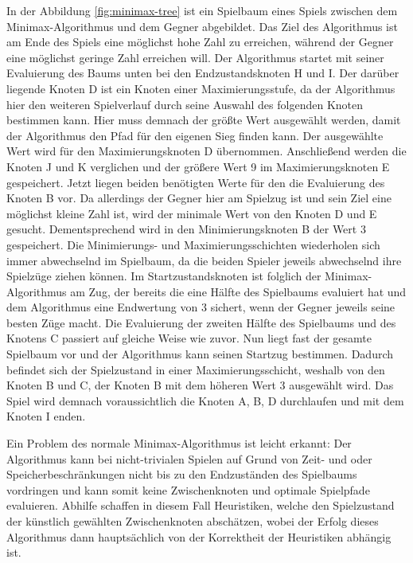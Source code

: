In der Abbildung \ref{fig:minimax-tree} ist ein Spielbaum eines Spiels zwischen dem Minimax-Algorithmus und dem Gegner abgebildet. Das Ziel des Algorithmus ist am Ende des Spiels eine möglichst hohe Zahl zu erreichen, während der Gegner eine möglichst geringe Zahl erreichen will. Der Algorithmus startet mit seiner Evaluierung des Baums unten bei den Endzustandsknoten H und I. Der darüber liegende Knoten D ist ein Knoten einer Maximierungsstufe, da der Algorithmus hier den weiteren Spielverlauf durch seine Auswahl des folgenden Knoten bestimmen kann. Hier muss demnach der größte Wert ausgewählt werden, damit der Algorithmus den Pfad für den eigenen Sieg finden kann. Der ausgewählte Wert wird für den Maximierungsknoten D übernommen. Anschließend werden die Knoten J und K verglichen und der größere Wert 9 im Maximierungsknoten E gespeichert. Jetzt liegen beiden benötigten Werte für den die Evaluierung des Knoten B vor. Da allerdings der Gegner hier am Spielzug ist und sein Ziel eine möglichst kleine Zahl ist, wird der minimale Wert von den Knoten D und E gesucht. Dementsprechend wird in den Minimierungsknoten B der Wert 3 gespeichert. Die Minimierungs- und Maximierungsschichten wiederholen sich immer abwechselnd im Spielbaum, da die beiden Spieler jeweils abwechselnd ihre Spielzüge ziehen können. Im Startzustandsknoten ist folglich der Minimax-Algorithmus am Zug, der bereits die eine Hälfte des Spielbaums evaluiert hat und dem Algorithmus eine Endwertung von 3 sichert, wenn der Gegner jeweils seine besten Züge macht. Die Evaluierung der zweiten Hälfte des Spielbaums und des Knotens C passiert auf gleiche Weise wie zuvor. Nun liegt fast der gesamte Spielbaum vor und der Algorithmus kann seinen Startzug bestimmen. Dadurch befindet sich der Spielzustand in einer Maximierungsschicht, weshalb von den Knoten B und C, der Knoten B mit dem höheren Wert 3 ausgewählt wird. Das Spiel wird demnach voraussichtlich die Knoten A, B, D durchlaufen und mit dem Knoten I enden.

Ein Problem des normale Minimax-Algorithmus ist leicht erkannt: Der Algorithmus kann bei nicht-trivialen Spielen auf Grund von Zeit- und oder Speicherbeschränkungen nicht bis zu den Endzuständen des Spielbaums vordringen und kann somit keine Zwischenknoten und optimale Spielpfade evaluieren. Abhilfe schaffen in diesem Fall Heuristiken, welche den Spielzustand der künstlich gewählten Zwischenknoten abschätzen, wobei der Erfolg dieses Algorithmus dann hauptsächlich von der Korrektheit der Heuristiken abhängig ist. \cite{AlgorithmsMinimax}


